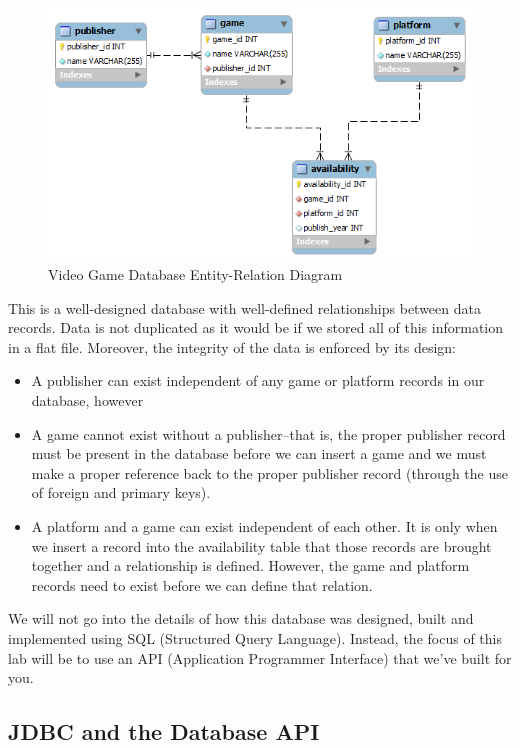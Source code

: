 \documentclass[12pt]{scrartcl}
\begin{document}
\begin{figure}
\centering
\includegraphics[scale=0.75]{videoGameDatabase}
\caption{Video Game Database Entity-Relation Diagram}
\label{figure:videoGameDatabase}
\end{figure}
 
This is a well-designed database with well-defined relationships 
between data records.  Data is not duplicated as it would be if 
we stored all of this information in a flat file.  Moreover, the 
integrity of the data is enforced by its design:
\begin{itemize}
  \item A publisher can exist independent of any game or platform 
  	records in our database, however
  \item A game cannot exist without a publisher--that is, the proper 
	publisher record must be present in the database before we 
	can insert a game and we must make a proper reference back 
	to the proper publisher record (through the use of foreign and 
	primary keys).
  \item A platform and a game can exist independent of each other.  
	It is only when we insert a record into the availability table that 
	those records are brought together and a relationship is defined.  
	However, the game and platform records need to exist before 
	we can define that relation.
\end{itemize}
	
We will not go into the details of how this database was designed, 
built and implemented using SQL (Structured Query Language).  
Instead, the focus of this lab will be to use an API (Application 
Programmer Interface) that we've built for you.

\subsection*{JDBC and the Database API}
\end{document}
